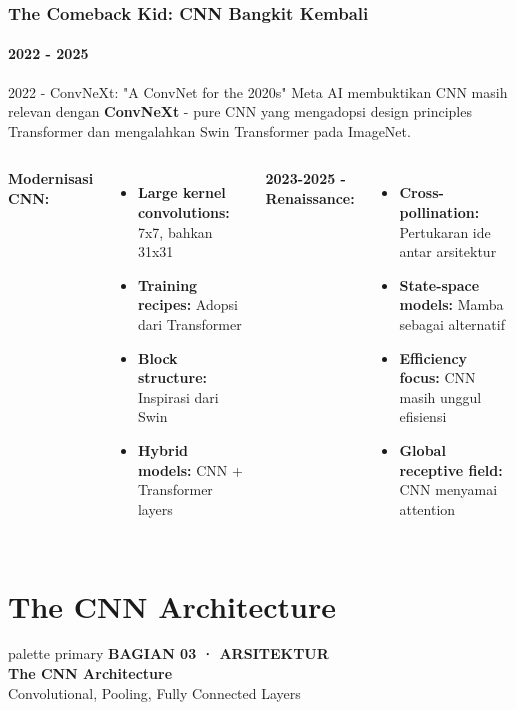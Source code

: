 \documentclass[t,aspectratio=169,xcolor=dvipsnames]{beamer}
\begin{document}
\begin{frame}
    \frametitle{The Comeback Kid: CNN Bangkit Kembali}
    \framesubtitle{2022 - 2025}
    \footnotesize

    \begin{exampleblock}{2022 - ConvNeXt: "A ConvNet for the 2020s"}
        Meta AI membuktikan CNN masih relevan dengan \textbf{ConvNeXt} - pure CNN yang mengadopsi design principles Transformer dan mengalahkan Swin Transformer pada ImageNet.
    \end{exampleblock}

    \begin{columns}[t]
        \textbf{Modernisasi CNN:}
        \begin{itemize}
            \item \textbf{Large kernel convolutions:} 7x7, bahkan 31x31
            \item \textbf{Training recipes:} Adopsi dari Transformer
            \item \textbf{Block structure:} Inspirasi dari Swin
            \item \textbf{Hybrid models:} CNN + Transformer layers
        \end{itemize}

        \textbf{2023-2025 - Renaissance:}
        \begin{itemize}
            \item \textbf{Cross-pollination:} Pertukaran ide antar arsitektur
            \item \textbf{State-space models:} Mamba sebagai alternatif
            \item \textbf{Efficiency focus:} CNN masih unggul efisiensi
            \item \textbf{Global receptive field:} CNN menyamai attention
        \end{itemize}
    \end{columns}
\end{frame}

\section{The CNN Architecture}

\begin{frame}[plain]
  \begin{beamercolorbox}[wd=\paperwidth,ht=\paperheight,sep=1.5cm]{palette primary}
    \vspace{1.5cm}
    {\scriptsize\bfseries\color{dlMute}BAGIAN 03 · ARSITEKTUR}\\[0.4cm]
    {\Huge\bfseries The CNN Architecture}\\[0.4cm]
    {\small\color{dlHairline}Convolutional, Pooling, Fully Connected Layers}
    \vfill
  \end{beamercolorbox}
\end{frame}
\end{document}
